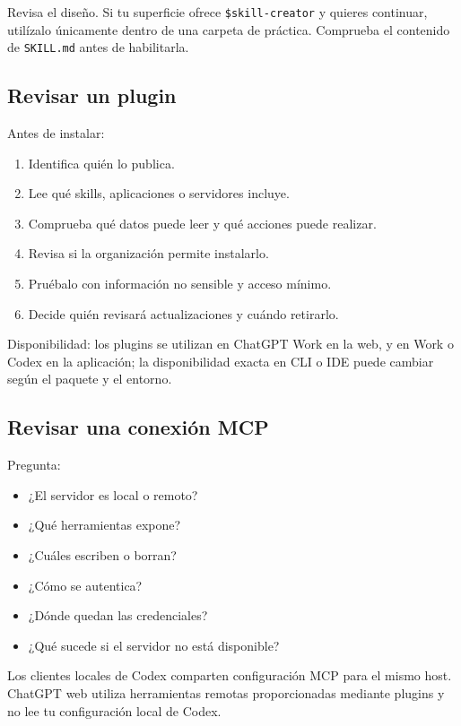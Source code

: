 \documentclass[10pt,a4paper,openany]{book}
\providecommand{\tightlist}{\setlength{\itemsep}{0.18em}\setlength{\parskip}{0pt}}
\begin{document}
Revisa el diseño. Si tu superficie ofrece \texttt{\$skill-creator} y
quieres continuar, utilízalo únicamente dentro de una carpeta de
práctica. Comprueba el contenido de \texttt{SKILL.md} antes de
habilitarla.

\subsection{Revisar un plugin}\label{revisar-un-plugin}

Antes de instalar:

\begin{enumerate}
\def\labelenumi{\arabic{enumi}.}
\tightlist
\item
  Identifica quién lo publica.
\item
  Lee qué skills, aplicaciones o servidores incluye.
\item
  Comprueba qué datos puede leer y qué acciones puede realizar.
\item
  Revisa si la organización permite instalarlo.
\item
  Pruébalo con información no sensible y acceso mínimo.
\item
  Decide quién revisará actualizaciones y cuándo retirarlo.
\end{enumerate}

Disponibilidad: los plugins se utilizan en ChatGPT Work en la web, y en
Work o Codex en la aplicación; la disponibilidad exacta en CLI o IDE
puede cambiar según el paquete y el entorno.

\subsection{Revisar una conexión MCP}\label{revisar-una-conexiuxf3n-mcp}

Pregunta:

\begin{itemize}
\tightlist
\item
  ¿El servidor es local o remoto?
\item
  ¿Qué herramientas expone?
\item
  ¿Cuáles escriben o borran?
\item
  ¿Cómo se autentica?
\item
  ¿Dónde quedan las credenciales?
\item
  ¿Qué sucede si el servidor no está disponible?
\end{itemize}

Los clientes locales de Codex comparten configuración MCP para el mismo
host. ChatGPT web utiliza herramientas remotas proporcionadas mediante
plugins y no lee tu configuración local de Codex.
\end{document}
